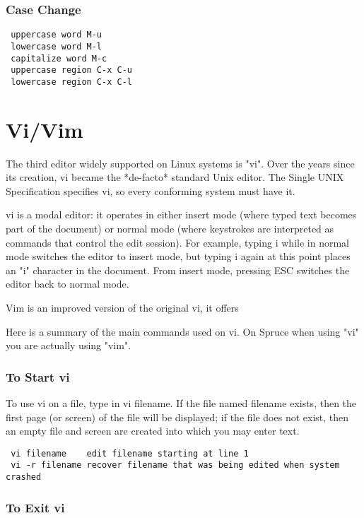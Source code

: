 \subsubsection{Case Change}

\begin{lstlisting}
 uppercase word M-u
 lowercase word M-l
 capitalize word M-c
 uppercase region C-x C-u
 lowercase region C-x C-l
\end{lstlisting}

\section{Vi/Vim}

The third editor widely supported on Linux systems is "vi".
Over the years since its creation, vi became the *de-facto* standard Unix editor. 
The Single UNIX Specification specifies vi, so every conforming system must have it.

vi is a modal editor: it operates in either insert mode (where typed text becomes part of the document) or normal mode (where keystrokes are interpreted as commands that control the edit session). 
For example, typing i while in normal mode switches the editor to insert mode, but typing i again at this point places an "i" character in the document. 
From insert mode, pressing ESC switches the editor back to normal mode.

Vim is an improved version of the original vi, it offers 

Here is a summary of the main commands used on vi. On Spruce when using "vi" you are actually using "vim".


\subsubsection{To Start vi}

To use vi on a file, type in vi filename. If the file named filename exists, then the first page (or screen) of the file will be displayed; if the file does not exist, then an empty file and screen are created into which you may enter text.

\begin{lstlisting}
 vi filename	edit filename starting at line 1
 vi -r filename	recover filename that was being edited when system crashed
\end{lstlisting}

\subsubsection{To Exit vi}

